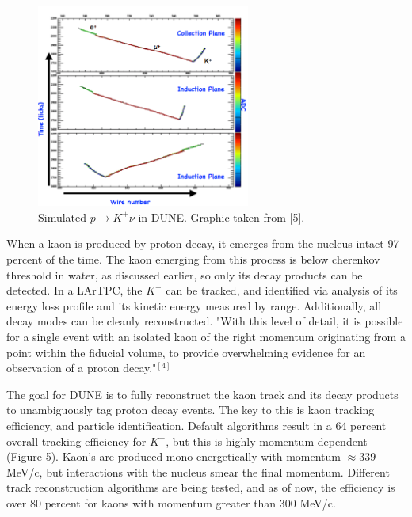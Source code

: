 \documentclass[aps,onecolumn,twoside,secnumarabic,balancelastpage,amsmath,amssymb,nofootinbib,hyperref=pdftex]{revtex4}
\begin{document}
\begin{figure}[htbp]
\begin{center}
\includegraphics[width=7cm]{DUNE_kaon.png}
\caption{Simulated $p \rightarrow K^{+}\bar{\nu}$ in DUNE. Graphic taken from [5].}
\label{default}
\end{center}
\end{figure}
When a kaon is produced by proton decay, it emerges from the nucleus intact 97 percent of the time. The kaon emerging from this process is below cherenkov threshold in water, as discussed earlier, so only its decay products can be detected. In a LArTPC, the $K^{+}$ can be tracked, and identified via analysis of its energy loss profile and its kinetic energy measured by range. Additionally, all decay modes can be cleanly reconstructed. "With this level of detail, it is possible for a single event with an isolated kaon of the right momentum originating from a point within the fiducial volume, to provide overwhelming evidence for an observation of a proton decay."$^{[4]}$

The goal for DUNE is to fully reconstruct the kaon track and its decay products to unambiguously tag proton decay events. The key to this is kaon tracking efficiency, and particle identification. Default algorithms result in a 64 percent overall tracking efficiency for $K^{+}$, but this is highly momentum dependent (Figure 5). Kaon's are produced mono-energetically with momentum $\approx 339$ MeV/c, but interactions with the nucleus smear the final momentum. Different track reconstruction algorithms are being tested, and as of now, the efficiency is over 80 percent for kaons with momentum greater than 300 MeV/c.
\end{document}
